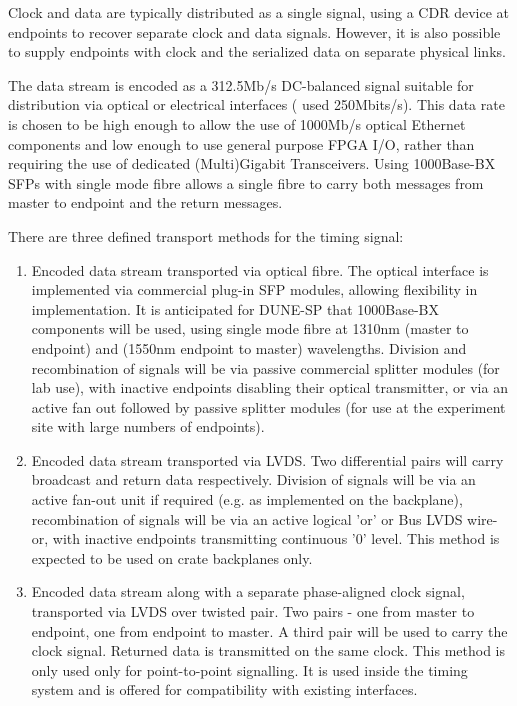 \documentclass{dune}
\begin{document}
Clock and data are typically distributed as a single signal, using a CDR device at endpoints to recover separate clock and data signals. However, it is also possible to supply endpoints with clock and the serialized data on separate physical links. 

The data stream is encoded as a 312.5Mb/s DC-balanced signal suitable for distribution via optical or electrical interfaces ( used 250Mbits/s). This data rate is chosen to be high enough to allow the use of 1000Mb/s optical Ethernet components and low enough to use general purpose FPGA I/O, rather than requiring the use of dedicated (Multi)Gigabit Transceivers. Using 1000Base-BX SFPs with single mode fibre allows a single fibre to carry both messages from master to endpoint and the return messages.

There are three defined transport methods for the timing signal:

\begin{enumerate}
	\item Encoded data stream transported via optical fibre. The optical interface is implemented via commercial plug-in SFP modules, allowing flexibility in implementation. It is anticipated for DUNE-SP that 1000Base-BX components will be used, using single mode fibre at 1310nm (master to endpoint) and (1550nm endpoint to master) wavelengths. Division and recombination of signals will be via passive commercial splitter modules (for lab use), with inactive endpoints disabling their optical transmitter, or via an active fan out followed by passive splitter modules (for use at the experiment site with large numbers of endpoints).
	\item Encoded data stream transported via LVDS. Two differential pairs will carry broadcast and return data respectively. Division of signals will be via an active fan-out unit if required (e.g. as implemented on the  backplane), recombination of signals will be via an active logical 'or' or Bus LVDS wire-or, with inactive endpoints transmitting continuous '0' level. This method is expected to be used on crate backplanes only.
	\item Encoded data stream along with a separate phase-aligned clock signal, transported via LVDS over twisted pair. Two pairs - one from master to endpoint, one from endpoint to master. A third pair will be used to carry the clock signal. Returned data is transmitted on the same clock. This method is only used only for point-to-point signalling. It is used inside the timing system and is offered for compatibility with existing interfaces.
\end{enumerate}
\end{document}

